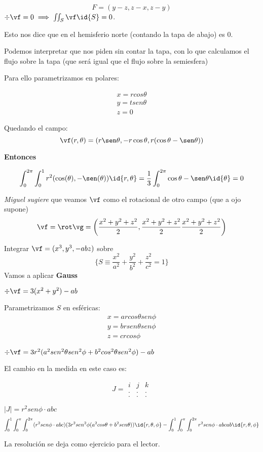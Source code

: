 \begin{problem}[25]
\[F=(y-z,z-x,z-y)\]
\solution
$\div \vf = 0 \implies \iint_S \vf \id{S}=0$.

Esto nos dice que en el hemisferio norte (contando la tapa de abajo) es 0.

Podemos interpretar que nos piden sin contar la tapa, con lo que calculamos el flujo sobre la tapa (que será igual que el flujo sobre la semiesfera)

Para ello parametrizamos en polares:

\begin{gather*}
x=rcos\theta\\
y=tsen\theta\\
z=0
\end{gather*}

Quedando el campo:
\[\vf(r,\theta) = (r\sen\theta,-r\cos\theta,r(\cos\theta-\sen\theta))\]

\textbf{Entonces}

\[\int_0^{2\pi}\int_0^1 r^2(\cos(\theta),-\sen(\theta))\id{r,\theta} = \frac{1}{3} \int_0^{2\pi} \cos\theta - \sen\theta \id{\theta} = 0\]

\textit{Miguel sugiere} que veamos $\vf$ como el rotacional de otro campo (que a ojo supone)
\[\vf=\rot\vg = \left(\frac{x^2+y^2+z^2}{2},\frac{x^2+y^2+z^2}{2}\frac{x^2+y^2+z^2}{2}\right)\]
\end{problem}

\begin{problem}[26]
Integrar $\vf = (x^3,y^3,-abz)$ sobre \[\{S \equiv \frac{x^2}{a^2} + \frac{y^2}{b^2} + \frac{z^2}{c^2} = 1\}\]
\solution
Vamos a aplicar \textbf{Gauss}

$\div\vf = 3(x^2+y^2)-ab$

Parametrizamos $S$ en esféricas:
\begin{gather*}
x=arcos\theta sen\phi\\
y=brsen\theta sen\phi\\
z=crcos\phi
\end{gather*}

$\div\vf = 3r^2(a^2 sen^2\theta sen^2\phi + b^2cos^2\theta sen^2\phi)-ab$

El cambio en la medida en este caso es:

\[J = \begin{matrix}
i&j&k\\
.&.&.\\
.&.&.
\end{matrix}\]

$|J| = r^2sen\phi\cdot abc$
\[\int_0^1\int_0^{\pi}\int_0^{2\pi} (r^2sen\phi\cdot abc) (3r^2sen^2\phi(a^2cos\theta + b^2sen\theta))\id{r,\theta,\phi} - \int_0^1\int_0^{\pi}\int_0^{2\pi} r^2sen\phi\cdot abcab \id{r,\theta,\phi}\]

La resolución se deja como ejercicio para el lector.
\end{problem}

